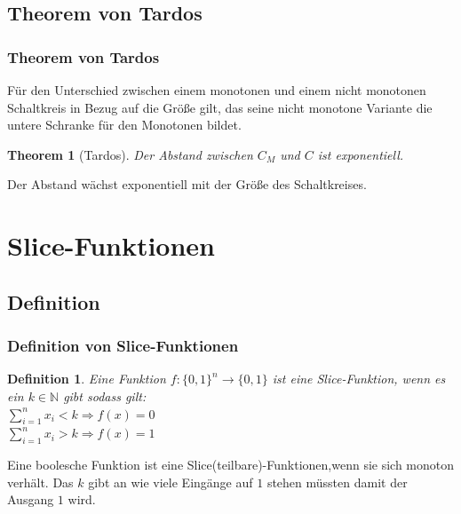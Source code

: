 \documentclass[hyperref={pdfpagelabels=false}]{beamer} %
\newtheorem{thm}{Theorem}
\newtheorem{defin}{Definition}
\begin{document}
  \subsection{Theorem von Tardos}
  \begin{frame}
    \frametitle{Theorem von Tardos}
    Für den Unterschied zwischen einem monotonen und einem nicht monotonen Schaltkreis in Bezug auf die Größe gilt, das seine nicht monotone Variante die untere Schranke für den Monotonen bildet.
    \begin{thm}[Tardos]
      Der Abstand zwischen $C_{M}$ und $C$ ist exponentiell. %
    \end{thm}
    Der Abstand w\"achst exponentiell mit der Gr\"o\ss{}e des Schaltkreises.
  \end{frame}

  \section{Slice-Funktionen}
  \subsection*{Definition}
  \begin{frame}%
    \frametitle{Definition von Slice-Funktionen}
    \begin{defin}
      Eine Funktion $f:\{0,1\}^n \rightarrow \{0,1\}$ ist eine Slice-Funktion, wenn es ein $k \in \mathbb{N}$ gibt sodass gilt:\\
      $\sum_{i=1}^{n} x_i<k\Rightarrow f(x)=0$\\
      $\sum_{i=1}^{n} x_i>k\Rightarrow f(x)=1$\\
    \end{defin}
    Eine boolesche Funktion ist eine Slice(teilbare)-Funktionen,wenn sie sich monoton verh\"alt.
    Das $k$ gibt an wie viele Eing\"ange auf $1$ stehen m\"ussten damit der Ausgang $1$ wird.
  \end{frame}
\end{document}
